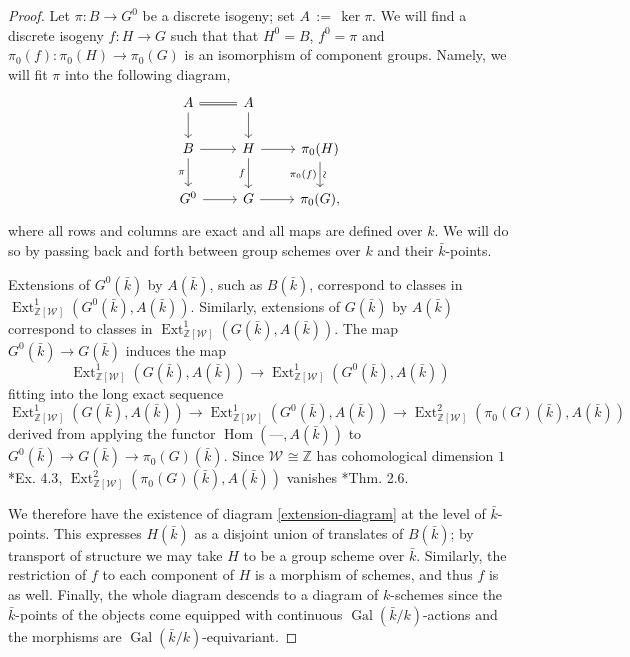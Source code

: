 \documentclass[CM,Submssn,SecEq]{degruyter-crelle} %
\theoremstyle{plain}
\theoremstyle{definition}
\theoremstyle{remark}
\newcommand{\ZZ}{{\mathbb{Z}}}
\newcommand{\bFq}{\bar{k}}
\newcommand{\Fq}{k}
\newcommand{\Weil}[1]{\mathcal{W}_{#1}}
\DeclareMathOperator{\Gal}{Gal}
\DeclareMathOperator{\Hom}{Hom}
\DeclareMathOperator{\Ext}{Ext}
\newcommand{\ceq}{{\, :=\, }}
\begin{document}
\begin{proof}
Let $\pi: B \to G^0$ be a discrete isogeny; set $A \ceq \ker \pi$.
  We will find a discrete isogeny $f: H\to G$
  such that that $H^0 = B$, $f^0 =\pi$ and
  $\pi_0(f) : \pi_0(H)\to \pi_0(G)$ is an isomorphism of component
  groups.  Namely, we will fit $\pi$ into the following diagram,
  \begin{equation}\label{extension-diagram}
  \begin{tikzcd}
  A \arrow[equal]{r} \dar & A \dar \\
  B \rar \dar[swap]{\pi} & H \rar \dar[swap]{f} & \pi_0(H) \arrow{d}[below,rotate=90]{\sim}[swap]{\pi_0(f)} \\
  G^0 \rar & G \rar & \pi_0(G),
  \end{tikzcd}
  \end{equation}
  where all rows and columns are exact and all maps are defined over
  $\Fq$.  We will do so by passing back and forth between group
  schemes over $\Fq$ and their $\bFq$-points.

  Extensions of $G^0(\bFq)$ by $A(\bFq)$, such as $B(\bFq)$,
  correspond to classes in $\Ext^1_{\ZZ[\Weil{}]}(G^0(\bFq), A(\bFq))$.
  Similarly, extensions of $G(\bFq)$ by $A(\bFq)$ correspond to
  classes in $\Ext^1_{\ZZ[\Weil{}]}(G(\bFq), A(\bFq))$.  The map
  $G^0(\bFq) \to G(\bFq)$ induces the map
  \[
  \Ext^1_{\ZZ[\Weil{}]}(G(\bFq), A(\bFq)) \to \Ext^1_{\ZZ[\Weil{}]}(G^0(\bFq), A(\bFq))
  \]
  fitting into the long exact sequence 
  \[
  \Ext^1_{\ZZ[\Weil{}]}(G(\bFq), A(\bFq)) \to \Ext^1_{\ZZ[\Weil{}]}(G^0(\bFq), A(\bFq)) \to \Ext^2_{\ZZ[\Weil{}]}(\pi_0(G)(\bFq), A(\bFq))
  \]
  derived from applying
  the functor $\Hom(\mbox{---}, A(\bFq))$ to $G^0(\bFq) \to G(\bFq) \to \pi_0(G)(\bFq)$.
  Since $\Weil{} \cong \ZZ$ has cohomological dimension $1$ \cite{brown:CohomologyGrps}*{Ex. 4.3},
  $\Ext^2_{\ZZ[\Weil{}]}(\pi_0(G)(\bFq), A(\bFq))$ vanishes \cite{cartan-eilenberg:HomologicalAlgebra}*{Thm. 2.6}.

  We therefore have the existence of diagram \eqref{extension-diagram}
  at the level of $\bFq$-points.  This expresses $H(\bFq)$ as a
  disjoint union of translates of $B(\bFq)$; by transport of structure
  we may take $H$ to be a group scheme over $\bFq$.  Similarly, the
  restriction of $f$ to each component of $H$ is a morphism of
  schemes, and thus $f$ is as well.  Finally, the whole diagram
  descends to a diagram of $\Fq$-schemes since the $\bFq$-points of
  the objects come equipped with continuous $\Gal(\bFq/\Fq)$-actions and the
  morphisms are $\Gal(\bFq/\Fq)$-equivariant.
\end{proof}
\end{document}
